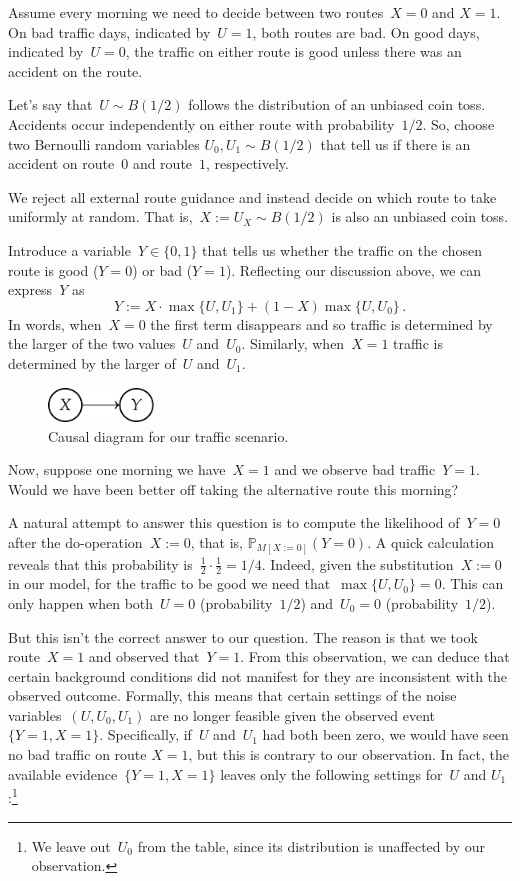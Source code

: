\documentclass{tufte-book}
\begin{document}
Assume every morning we need to decide between two routes~\(X=0\) and
\(X=1\). On bad traffic days, indicated by~\(U=1\), both routes are bad.
On good days, indicated by~\(U=0\), the traffic on either route is good
unless there was an accident on the route.

Let's say that~\(U\sim B(1/2)\) follows the distribution of an unbiased
coin toss. Accidents occur independently on either route with
probability~\(1/2.\) So, choose two Bernoulli random variables
\(U_0, U_1\sim B(1/2)\) that tell us if there is an accident on
route~\(0\) and route~\(1\), respectively.

We reject all external route guidance and instead decide on which route
to take uniformly at random. That is,~\(X:=U_X\sim B(1/2)\) is also an
unbiased coin toss.

Introduce a variable~\(Y\in\{0,1\}\) that tells us whether the traffic
on the chosen route is good (\(Y=0\)) or bad (\(Y=1\)). Reflecting our
discussion above, we can express~\(Y\) as \[
Y := X\cdot \max\{U, U_1\} + (1-X)\max\{U, U_0\} \,.
\] In words, when~\(X=0\) the first term disappears and so traffic is
determined by the larger of the two values~\(U\) and~\(U_0\). Similarly,
when~\(X=1\) traffic is determined by the larger of~\(U\) and~\(U_1\).

\begin{figure}
\centering
\includegraphics[width=0.25\textwidth,height=\textheight]{assets/causal-counterf}
\caption{Causal diagram for our traffic scenario.}
\end{figure}

Now, suppose one morning we have~\(X=1\) and we observe bad
traffic~\(Y=1.\) Would we have been better off taking the alternative
route this morning?

A natural attempt to answer this question is to compute the likelihood
of~\(Y=0\) after the do-operation~\(X:=0\), that is,
\(\mathbb{P}_{M[X:=0]}(Y=0).\) A quick calculation reveals that this
probability is~\(\frac12 \cdot \frac12 = 1/4.\) Indeed, given the
substitution~\(X:=0\) in our model, for the traffic to be good we need
that~\(\max\{U, U_0\}=0.\) This can only happen when both~\(U=0\)
(probability~\(1/2\)) and~\(U_0=0\) (probability~\(1/2\)).

But this isn't the correct answer to our question. The reason is that we
took route~\(X=1\) and observed that~\(Y=1.\) From this observation, we
can deduce that certain background conditions did not manifest for they
are inconsistent with the observed outcome. Formally, this means that
certain settings of the noise variables~\((U, U_0, U_1)\) are no longer
feasible given the observed event~\(\{Y=1, X=1\}\). Specifically,
if~\(U\) and~\(U_1\) had both been zero, we would have seen no bad
traffic on route \(X=1\), but this is contrary to our observation. In
fact, the available evidence~\(\{Y=1, X=1\}\) leaves only the following
settings for~\(U\) and \(U_1\):\footnote{We leave out~\(U_0\) from the
  table, since its distribution is unaffected by our observation.}
\end{document}
